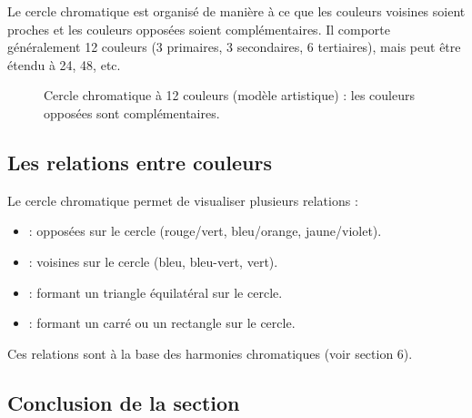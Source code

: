 Le cercle chromatique est organisé de manière à ce que les couleurs voisines soient proches et les couleurs opposées soient complémentaires. Il comporte généralement 12 couleurs (3 primaires, 3 secondaires, 6 tertiaires), mais peut être étendu à 24, 48, etc.

\begin{figure}[ht]
\centering
{}
\caption{Cercle chromatique à 12 couleurs (modèle artistique) : les couleurs opposées sont complémentaires.}
\end{figure}

\subsection{Les relations entre couleurs}

Le cercle chromatique permet de visualiser plusieurs relations :

\begin{itemize}
    \item {} : opposées sur le cercle (rouge/vert, bleu/orange, jaune/violet).
    \item {} : voisines sur le cercle (bleu, bleu-vert, vert).
    \item {} : formant un triangle équilatéral sur le cercle.
    \item {} : formant un carré ou un rectangle sur le cercle.
\end{itemize}

Ces relations sont à la base des harmonies chromatiques (voir section 6).

\subsection*{Conclusion de la section}

